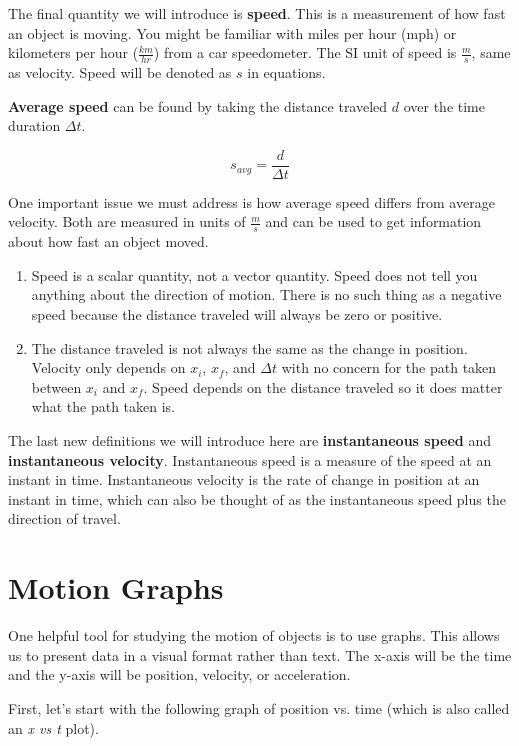 \documentclass[12pt]{book}
\begin{document}
The final quantity we will introduce is \textbf{speed}. This is a measurement of how fast an object is moving. You might be familiar with miles per hour (mph) or kilometers per hour ($\frac{km}{hr}$) from a car speedometer. The SI unit of speed is $\frac{m}{s}$, same as velocity. Speed will be denoted as $s$ in equations.

\textbf{Average speed} can be found by taking the distance traveled $d$ over the time duration $\Delta t$.

\begin{equation}
s_{avg} = \frac{d}{\Delta t}
\end{equation}

One important issue we must address is how average speed differs from average velocity. Both are measured in units of $\frac{m}{s}$ and can be used to get information about how fast an object moved.

\begin{enumerate}
\item Speed is a scalar quantity, not a vector quantity. Speed does not tell you anything about the direction of motion. There is no such thing as a negative speed because the distance traveled will always be zero or positive.

\item The distance traveled is not always the same as the change in position. Velocity only depends on $x_i$, $x_f$, and $\Delta t$ with no concern for the path taken between $x_i$ and $x_f$. Speed depends on the distance traveled so it does matter what the path taken is.
\end{enumerate}

The last new definitions we will introduce here are \textbf{instantaneous speed} and \textbf{instantaneous velocity}. Instantaneous speed is a measure of the speed at an instant in time. Instantaneous velocity is the rate of change in position at an instant in time, which can also be thought of as the instantaneous speed plus the direction of travel.

\section{Motion Graphs}

One helpful tool for studying the motion of objects is to use graphs. This allows us to present data in a visual format rather than text. The x-axis will be the time and the y-axis will be position, velocity, or acceleration.

First, let's start with the following graph of position vs. time (which is also called an \textit{x vs t} plot).
\end{document}
